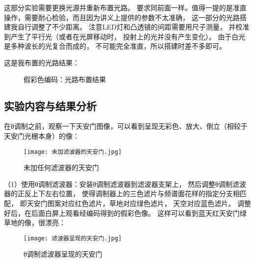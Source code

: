 \documentclass[11pt]{article}
\begin{document}
这部分实验需要更换光源并重新布置光路。
要求同前面一样。值得一提的是准直操作，需要耐心检验，而且因为讲义上提供的参数不太准确，
这一部分的光路搭建我自行调整了不少距离。
注意LED灯和凸透镜的间距需要用尺子测量，
并校准到产生了平行光（或者在光屏移动时，
投射上的光并没有产生变化）。
由于白光是多种波长的光复合而成的，
不可能完全准直，所以搭建时差不多即可。

这是我布置的光路结果：

\begin{figure}[H]
    \centering
    \hspace{0.5cm}
    \caption{假彩色编码：光路布置结果}
\end{figure}
\subsection{实验内容与结果分析}

在θ调制之前，观察一下天安门图像，可以看到呈现无彩色、放大、倒立（相较于天安门光栅本身）的像：
\begin{figure}[H]
    \centering
    \texttt{[image: 未加滤波器的天安门.jpg]}
    \caption{未加任何滤波器的天安门}
\end{figure}


（1）使用θ调制滤波器：安装θ调制滤波器到滤波器支架上，
然后调整θ调制滤波器的正反上下左右位置，
使得调制器上的三色滤片与频谱面花样的指定分支相匹配，
即天安门图案对应红色滤片，草地对应绿色滤片，
天空对应蓝色滤片。
调整好后，在后面白屏上观看经编码得到的假彩色像。
这样可以看到蓝天红天安门绿草地的像，很漂亮：

\begin{figure}[H]
    \centering
    \texttt{[image: 滤波器呈现的天安门.jpg]}
    \caption{θ调制滤波器呈现的天安门}
\end{figure}
\end{document}
